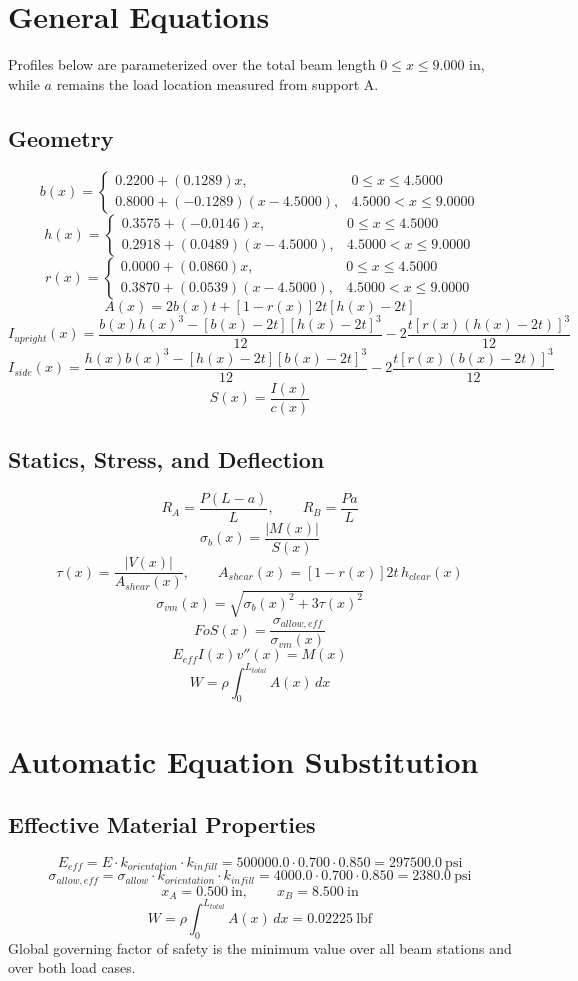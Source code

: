 \documentclass[11pt]{article}
\begin{document}
\section*{General Equations}
Profiles below are parameterized over the total beam length $0 \le x \le 9.000$ in, while $a$ remains the load location measured from support A.
\subsection*{Geometry}
\[
b(x)=\begin{cases}0.2200 + (0.1289)x, & 0 \le x \le 4.5000\\0.8000 + (-0.1289)(x-4.5000), & 4.5000 < x \le 9.0000\end{cases}
\]
\[
h(x)=\begin{cases}0.3575 + (-0.0146)x, & 0 \le x \le 4.5000\\0.2918 + (0.0489)(x-4.5000), & 4.5000 < x \le 9.0000\end{cases}
\]
\[
r(x)=\begin{cases}0.0000 + (0.0860)x, & 0 \le x \le 4.5000\\0.3870 + (0.0539)(x-4.5000), & 4.5000 < x \le 9.0000\end{cases}
\]
\[
A(x)=2b(x)t+[1-r(x)]2t[h(x)-2t]
\]
\[
I_{upright}(x)=\frac{b(x)h(x)^3-[b(x)-2t][h(x)-2t]^3}{12}-2\frac{t[r(x)(h(x)-2t)]^3}{12}
\]
\[
I_{side}(x)=\frac{h(x)b(x)^3-[h(x)-2t][b(x)-2t]^3}{12}-2\frac{t[r(x)(b(x)-2t)]^3}{12}
\]
\[
S(x)=\frac{I(x)}{c(x)}
\]

\subsection*{Statics, Stress, and Deflection}
\[
R_A=\frac{P(L-a)}{L}, \qquad R_B=\frac{Pa}{L}
\]
\[
\sigma_b(x)=\frac{|M(x)|}{S(x)}
\]
\[
\tau(x)=\frac{|V(x)|}{A_{shear}(x)}, \qquad A_{shear}(x)=[1-r(x)]2t\,h_{clear}(x)
\]
\[
\sigma_{vm}(x)=\sqrt{\sigma_b(x)^2+3\tau(x)^2}
\]
\[
FoS(x)=\frac{\sigma_{allow,eff}}{\sigma_{vm}(x)}
\]
\[
E_{eff}I(x)v''(x)=M(x)
\]
\[
W=\rho\int_0^{L_{total}} A(x)\,dx
\]

\section*{Automatic Equation Substitution}
\subsection*{Effective Material Properties}
\[E_{eff} = E \cdot k_{orientation} \cdot k_{infill} = 500000.0 \cdot 0.700 \cdot 0.850 = 297500.0\ \mathrm{psi}\]
\[\sigma_{allow,eff} = \sigma_{allow} \cdot k_{orientation} \cdot k_{infill} = 4000.0 \cdot 0.700 \cdot 0.850 = 2380.0\ \mathrm{psi}\]
\[x_A = 0.500\ \mathrm{in}, \qquad x_B = 8.500\ \mathrm{in}\]
\[W = \rho \int_0^{L_{total}} A(x)\,dx = 0.02225\ \mathrm{lbf}\]
Global governing factor of safety is the minimum value over all beam stations and over both load cases.
\end{document}
